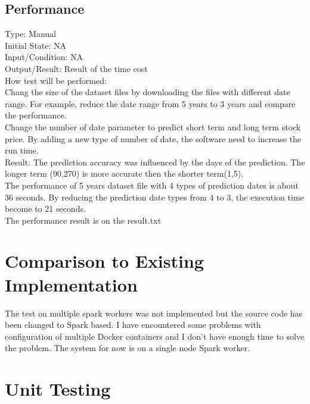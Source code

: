 \documentclass[12pt, titlepage]{article}
\begin{document}
\subsection{Performance}
Type: Manual\\
Initial State: NA\\
Input/Condition: NA\\
Output/Result: Result of the time cost\\
How test will be performed: \\
Chang the size of the dataset files by downloading the files with different date range. For example, reduce the date range from 5 years to 3 years and compare the performance. \\
Change the number of date parameter to predict short term and long term stock price. By adding a new type of number of date, the software need to increase the run time. \\
Result: The prediction accuracy was influenced by the days of the prediction. The longer term (90,270) is more accurate then the shorter term(1,5). \\ 
The performance of 5 years dataset file with 4 types of prediction dates is about 36 seconds. By reducing the prediction date types from 4 to 3, the execution time become to 21 seconds. \\
The performance result is on the result.txt
\section{Comparison to Existing Implementation} 

The test on multiple spark workers was not implemented but the source code has been changed to Spark based. I have encountered some problems with configuration of multiple Docker containers and I don't have enough time to solve the problem. The system for now is on a single node Spark worker.

\section{Unit Testing}
\end{document}
